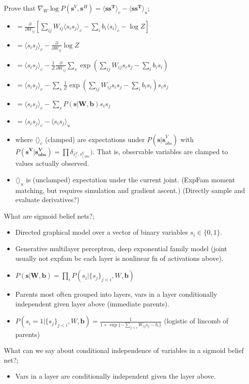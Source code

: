 \documentclass{article}
\begin{document}
Prove that $\nabla_W\log P(\mathbf{s}^V, \mathbf{s}^H)=\langle \mathbf{ss^T} \rangle_c - \langle \mathbf{ss^T} \rangle_u$; \begin{itemize}
    \item $=\frac{\partial}{\partial W_{ij}}[\sum_{ij}W_{ij}\langle s_is_j\rangle_c -\sum_ib_i\langle s_i\rangle_c- \log Z]$
    \item $=\langle s_is_j \rangle_c - \frac{\partial}{\partial W_{ij}}\log Z$
    \item $=\langle s_is_j \rangle_c - \frac{1}{Z}\frac{\partial}{\partial W_{ij}}\sum_s \exp(\sum_{ij}W_{ij}s_is_j - \sum_i b_i s_i)$
    \item $=\langle s_is_j \rangle_c - \sum_s\frac{1}{Z} \exp(\sum_{ij}W_{ij}s_is_j - \sum_i b_i s_i)s_is_j$
    \item $=\langle s_is_j \rangle_c - \sum_sP(\mathbf{s|W, b})s_is_j$
    \item $=\langle s_is_j \rangle_c - \langle s_is_j \rangle_u$
    \item where $\langle \rangle_c$ (clamped) are expectations under $P(\mathbf{s|s}^V_{obs})$ with $P(\mathbf{s^V|s^V_{obs}})=\prod\delta_{s^V_i, s^V_{i, obs}})$. That is, observable variables are clamped to values actually observed.
    \item $\langle \rangle_u$ is (unclamped) expectation under the current joint. (ExpFam moment matching, but requires simulation and gradient ascent.) (Directly sample and evaluate derivatives?)
\end{itemize}

What are sigmoid belief nets?; \begin{itemize}
    \item Directed graphical model over a vector of binary variables $s_i\in\{0, 1\}$.
    \item Generative multilayer perceptron, deep exponential family model (joint usually not expfam bc each layer is nonlinear fn of activations above).
    \item $P(\mathbf{s|W, b})=\prod_i P(s_i|\{s_j\}_{j<i}, W, \mathbf{b})$
    \item Parents most often grouped into layers, vars in a layer conditionally independent given layer above (immediate parents).
    \item $P(s_i=1|\{s_j\}_{j<i}, W, \mathbf{b})=\frac{1}{1+\exp\{-\sum_{j<i}W_{ij}s_j-b_i\}}$ (logistic of lincomb of parents)
\end{itemize}

What can we say about conditional independence of variables in a sigmoid belief net?; \begin{itemize}
    \item Vars in a layer are conditionally independent given the layer above.
\end{itemize}
\end{document}

